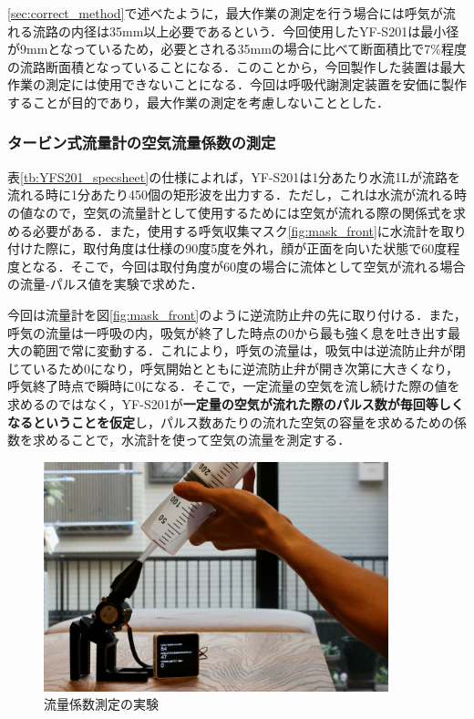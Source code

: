 \ref{sec:correct_method}で述べたように，最大作業の測定を行う場合には呼気が流れる流路の内径は35mm以上必要であるという．今回使用したYF-S201は最小径が9mmとなっているため，必要とされる35mmの場合に比べて断面積比で7\%程度の流路断面積となっていることになる．このことから，今回製作した装置は最大作業の測定には使用できないことになる．今回は呼吸代謝測定装置を安価に製作することが目的であり，最大作業の測定を考慮しないこととした．

\subsubsection{タービン式流量計の空気流量係数の測定}
\label{sec:measuring_coefficient}

表\ref{tb:YFS201_specsheet}の仕様によれば，YF-S201は1分あたり水流1Lが流路を流れる時に1分あたり450個の矩形波を出力する．ただし，これは水流が流れる時の値なので，空気の流量計として使用するためには空気が流れる際の関係式を求める必要がある．また，使用する呼気収集マスク\ref{fig:mask_front}に水流計を取り付けた際に，取付角度は仕様の90度\pm5度を外れ，顔が正面を向いた状態で60度程度となる．そこで，今回は取付角度が60度の場合に流体として空気が流れる場合の流量-パルス値を実験で求めた．

今回は流量計を図\ref{fig:mask_front}のように逆流防止弁の先に取り付ける．また，呼気の流量は一呼吸の内，吸気が終了した時点の0から最も強く息を吐き出す最大の範囲で常に変動する．これにより，呼気の流量は，吸気中は逆流防止弁が閉じているため0になり，呼気開始とともに逆流防止弁が開き次第に大きくなり，呼気終了時点で瞬時に0になる．そこで，一定流量の空気を流し続けた際の値を求めるのではなく，YF-S201が{\bf 一定量の空気が流れた際のパルス数が毎回等しくなるということを仮定}し，パルス数あたりの流れた空気の容量を求めるための係数を求めることで，水流計を使って空気の流量を測定する．

\begin{figure}[H]
  \begin{center}
    \includegraphics[width=10cm]{fig/flowsensor_calibrate}
    \caption{流量係数測定の実験}
    \label{fig:flowsensor_calibrate}
  \end{center}
\end{figure}

